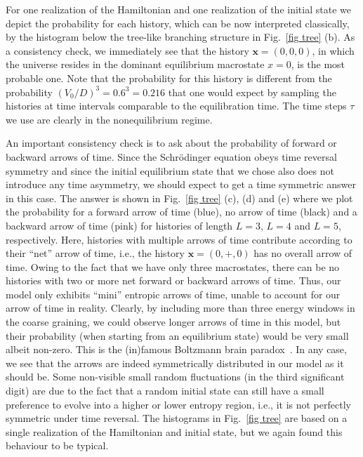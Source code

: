 \documentclass[pre,twocolumn,10pt,aps,longbibliography,nofootinbib]{revtex4-1}
\newcommand{\bb}[1]{\textbf{#1}}
\newcommand{\blue}[1]{#1}
\begin{document}
For one realization of the Hamiltonian and one realization of the initial state we depict the probability for each 
history, which can be now interpreted classically, by the histogram below the tree-like branching structure in
Fig.~\ref{fig tree} (b). As a consistency check, we immediately see that the history $\bb x=(0,0,0)$, in which the
universe resides in the dominant equilibrium macrostate $x=0$, is the most probable one. Note that the probability
for this history is different from the probability $(V_0/D)^3 = 0.6^3= 0.216$ that one would expect by sampling the
histories at time intervals comparable to the equilibration time. The time steps $\tau$ we use are clearly in the nonequilibrium regime.

An important consistency check is to ask about the probability of forward or backward arrows of time. Since the Schr\"odinger equation obeys time reversal symmetry and since the initial equilibrium state that we chose also does not introduce any time asymmetry, we should expect to get a time symmetric answer in this case. The answer is shown in Fig.~\ref{fig tree} (c), (d) and (e) where we plot the probability for a forward arrow of time (blue), no arrow of time (black) and a backward arrow of time (pink) for histories of length $L=3$, $L=4$ and $L=5$, respectively. Here, histories with multiple arrows of time contribute according to their ``net'' arrow of time, i.e., the history $\bb x=(0,+,0)$ has no overall arrow of time. Owing to the fact that we have only three macrostates, there can be no histories with two or more net forward or backward arrows of time. \blue{Thus, our model only exhibits ``mini'' entropic arrows of time, unable to account for our arrow of time in reality. Clearly, by including more than three energy windows in the coarse graining, we could observe longer arrows of time in this model, but their probability (when starting from an equilibrium state) would be very small albeit non-zero. This is the (in)famous Boltzmann brain paradox~\cite{AlbrechtSorboPRD2004, CarrollInBook2020, MuellerQuantum2020}. In any case,} we see that the arrows are indeed symmetrically distributed in our model as it should be. Some non-visible small random fluctuations (in the third significant digit) are due to the fact that a random initial state can still have a small preference to evolve into a higher or lower entropy region, i.e., it is not perfectly symmetric under time reversal. The histograms in Fig.~\ref{fig tree} are based on a single realization of the Hamiltonian and initial state, but we again found this behaviour to be typical.
\end{document}
